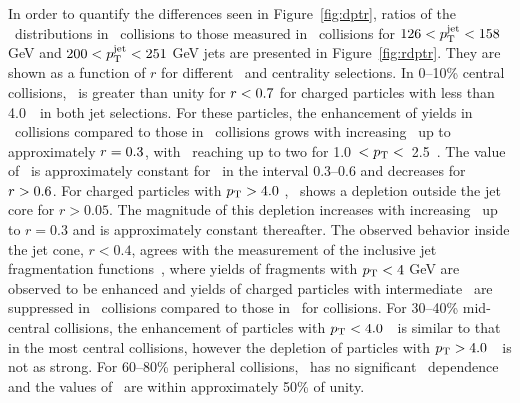 In order to quantify the differences seen in Figure~\ref{fig:dptr}, ratios of the \Dptr\ distributions in \pbpb\ collisions
to those measured in \pp\ collisions for $126 < \mbox{$p_{\mathrm{T}}^{\mathrm{jet}}$} < 158$ GeV and $200 < \mbox{$p_{\mathrm{T}}^{\mathrm{jet}}$} < 251$ GeV jets 
are presented in Figure~\ref{fig:rdptr}. They are shown as a function of $r$ for different \pt\ and centrality selections. In 0--10\% central collisions,
\RDptr\ is greater than unity for $\mbox{$r$} < 0.7$ for charged particles with \pT less than 4.0~\GeV\ in both jet selections. 
For these particles, the enhancement of yields in \pbpb\ collisions compared to those in  \pp\ 
collisions grows with increasing \rvar\ up to approximately \mbox{$\mbox{$r$}  = 0.3$}, with \RDptr\ reaching up to two for
1.0~$< \mbox{$p_{\mathrm{T}}$} <$~2.5~\GeV.
The value of \RDptr\ is approximately constant for \rvar\ in the interval \mbox{0.3--0.6} and decreases for \mbox{$\mbox{$r$} > 0.6$}.  For charged particles with $\mbox{$p_{\mathrm{T}}$} > 4.0$ \GeV, \RDptr\ shows a depletion outside the jet core for $r > 0.05$. The magnitude of this depletion increases with increasing \rvar\ up to $r = 0.3$ and is approximately constant thereafter.
 The observed behavior inside the jet cone, $r < 0.4$, agrees with the measurement of the inclusive jet fragmentation functions~\cite{Aaboud:2017eww,PhysRevC.98.024908}, where yields of fragments with $\mbox{$p_{\mathrm{T}}$} < 4$ GeV are observed to be enhanced and yields of charged particles with intermediate \pT\ are suppressed in \PbPb\ collisions compared to those in \pp\ for collisions. 
 For 30--40\% mid-central collisions, the enhancement of particles with $\mbox{$p_{\mathrm{T}}$} < 4.0$~\GeV\ is similar to that in the most central 
 collisions, however the depletion of particles with $\mbox{$p_{\mathrm{T}}$} > 4.0$~\GeV\ is not as strong.
For 60--80\% peripheral collisions, \RDptr\ has no significant \rvar\ dependence and the values of \RDptr\ are within approximately 50\% of unity.

